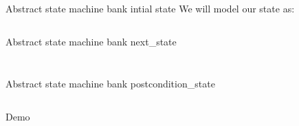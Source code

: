 \begin{frame}{Abstract state machine bank intial state}
  We will model our state as:

  \inputminted{erlang}{./code/state.erl}
\end{frame}



\begin{frame}{Abstract state machine bank next\_state}
  \inputminted{erlang}{./code/next_model_state.erl}
\end{frame}

\begin{frame}
  \inputminted{erlang}{./code/next_model_state1.erl}
\end{frame}



\begin{frame}{Abstract state machine bank postcondition\_state}
  \inputminted{erlang}{./code/postcondition_model_state.erl}
\end{frame}

\begin{frame}{}{}
  \begin{center}
    \vspace{15pt}
    {\Huge Demo}
  \end{center}
\end{frame}